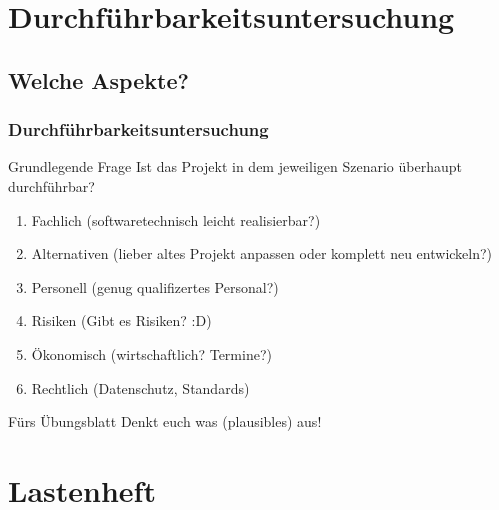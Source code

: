 \documentclass[18pt]{beamer}
\begin{document}
\section{Durchführbarkeitsuntersuchung}
	\subsection{Welche Aspekte?}
	\begin{frame}
		\frametitle{Durchführbarkeitsuntersuchung}
		\begin{block}{Grundlegende Frage}
			Ist das Projekt in dem jeweiligen Szenario überhaupt durchführbar?
		\end{block}
		\begin{enumerate}
			\item \pause Fachlich \pause (softwaretechnisch leicht realisierbar?) \pause
			\item Alternativen \pause (lieber altes Projekt anpassen oder komplett neu entwickeln?) \pause
			\item Personell \pause (genug qualifizertes Personal?) \pause
			\item Risiken \pause (Gibt es Risiken? :D) \pause
			\item Ökonomisch \pause (wirtschaftlich? Termine?) \pause
			\item Rechtlich \pause (Datenschutz, Standards)
		\end{enumerate}
		\pause
		\begin{alertblock}{Fürs Übungsblatt}
			Denkt euch was (plausibles) aus!
		\end{alertblock}
	\end{frame}

\section{Lastenheft}
\end{document}
